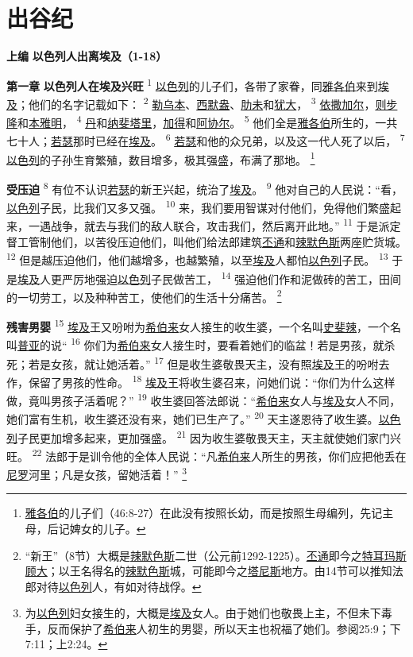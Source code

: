 \chapter{出谷纪}

\begin{center}
	\textbf{上编 }
	\textbf{以色列人出离埃及（1-18）}
\end{center}

\textbf{第一章 }
\textbf{以色列人在埃及兴旺 }
\textsuperscript{1}
\uline{以色列}的儿子们，各带了家眷，同\uline{雅各伯}来到\uline{埃及}；他们的名字记载如下：
\textsuperscript{2}
\uline{勒乌本}、\uline{西默盎}、\uline{肋未}和\uline{犹大}，
\textsuperscript{3}
\uline{依撒}\uline{加尔}，\uline{则步隆}和\uline{本雅明}，
\textsuperscript{4}
\uline{丹}和\uline{纳斐塔里}，\uline{加得}和\uline{阿协尔}。
\textsuperscript{5}
他们全是\uline{雅各伯}所生的，一共七十人；\uline{若瑟}那时已经在\uline{埃及}。
\textsuperscript{6}
\uline{若瑟}和他的众兄弟，以及这一代人死了以后，
\textsuperscript{7}
\uline{以色列}的子孙生育繁殖，数目增多，极其强盛，布满了那地。
\renewcommand\thefootnote{\ding{\numexpr171+\value{footnote}}}
\footnote{\uline{雅各伯}的儿子们（46:8-27）在此没有按照长幼，而是按照生母编列，先记主母，后记婢女的儿子。}

\textbf{受压迫 }
\textsuperscript{8}
有位不认识\uline{若瑟}的新王兴起，统治了\uline{埃及}。
\textsuperscript{9}
他对自己的人民说：“看，\uline{以色列}子民，比我们又多又强。
\textsuperscript{10}
来，我们要用智谋对付他们，免得他们繁盛起来，一遇战争，就去与我们的敌人联合，攻击我们，然后离开此地。”
\textsuperscript{11}
于是派定督工管制他们，以苦役压迫他们，叫他们给法郎建筑\uline{丕通}和\uline{辣默}\uline{色斯}两座贮货城。
\textsuperscript{12}
但是越压迫他们，他们越增多，也越繁殖，以至\uline{埃及}人都怕\uline{以色列}子民。
\textsuperscript{13}
于是\uline{埃及}人更严厉地强迫\uline{以色列}子民做苦工，
\textsuperscript{14}
强迫他们作和泥做砖的苦工，田间的一切劳工，以及种种苦工，使他们的生活十分痛苦。
\footnote{“新王”（8节）大概是\uline{辣默色斯}二世（公元前1292-1225）。\uline{丕通}即今之\uline{特耳玛斯}\uline{顾大}；以王名得名的\uline{辣默色斯}城，可能即今之\uline{塔尼斯}地方。由14节可以推知法郎对待\uline{以色列}人，有如对待战俘。}

\textbf{残害男婴 }
\textsuperscript{15}
\uline{埃及}王又吩咐为\uline{希伯来}女人接生的收生婆，一个名叫\uline{史斐辣}，一个名叫\uline{普亚}的说“
\textsuperscript{16}
你们为\uline{希伯来}女人接生时，要看着她们的临盆！若是男孩，就杀死；若是女孩，就让她活着。”
\textsuperscript{17}
但是收生婆敬畏天主，没有照\uline{埃及}王的吩咐去作，保留了男孩的性命。
\textsuperscript{18}
\uline{埃及}王将收生婆召来，问她们说：“你们为什么这样做，竟叫男孩子活着呢？”
\textsuperscript{19}
收生婆回答法郎说：“\uline{希伯来}女人与\uline{埃及}女人不同，她们富有生机，收生婆还没有来，她们已生产了。”
\textsuperscript{20}
天主遂恩待了收生婆。\uline{以色列}子民更加增多起来，更加强盛。
\textsuperscript{21}
因为收生婆敬畏天主，天主就使她们家门兴旺。
\textsuperscript{22}
法郎于是训令他的全体人民说：“凡\uline{希伯来}人所生的男孩，你们应把他丢在\uline{尼罗}河里；凡是女孩，留她活着！”
\footnote{为\uline{以色列}妇女接生的，大概是\uline{埃及}女人。由于她们也敬畏上主，不但未下毒手，反而保护了\uline{希伯来}人初生的男婴，所以天主也祝福了她们。参阅25:9；下7:11；上2:24。}